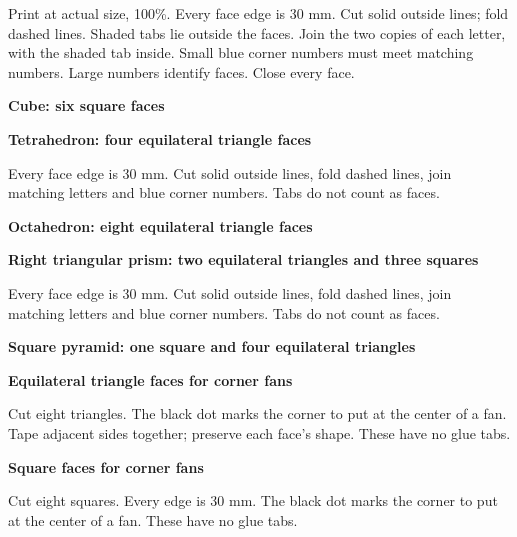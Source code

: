 \documentclass[11pt,letterpaper]{article}
\newcommand{\net}[2]{\par\vspace{.15cm}\textbf{#1}\par\begin{center}\end{center}}
\begin{document}
Print at actual size, 100\%. Every face edge is 30 mm. Cut solid outside lines; fold dashed lines. Shaded tabs lie outside the faces. Join the two copies of each letter, with the shaded tab inside. Small blue corner numbers must meet matching numbers. Large numbers identify faces. Close every face.
\begin{center}\end{center}
\net{Cube: six square faces}{cube-net.tex}
\vspace{.1cm}\net{Tetrahedron: four equilateral triangle faces}{tetrahedron-net.tex}
\newpage
Every face edge is 30 mm. Cut solid outside lines, fold dashed lines, join matching letters and blue corner numbers. Tabs do not count as faces.
\net{Octahedron: eight equilateral triangle faces}{octahedron-net.tex}
\vspace{.35cm}\net{Right triangular prism: two equilateral triangles and three squares}{triangular-prism-net.tex}
\newpage
Every face edge is 30 mm. Cut solid outside lines, fold dashed lines, join matching letters and blue corner numbers. Tabs do not count as faces.
\net{Square pyramid: one square and four equilateral triangles}{square-pyramid-net.tex}
\textbf{Equilateral triangle faces for corner fans}\par
Cut eight triangles. The black dot marks the corner to put at the center of a fan. Tape adjacent sides together; preserve each face's shape. These have no glue tabs.
\begin{center}
\end{center}
\newpage
\textbf{Square faces for corner fans}\par
Cut eight squares. Every edge is 30 mm. The black dot marks the corner to put at the center of a fan. These have no glue tabs.
\begin{center}
\end{center}
\end{document}
